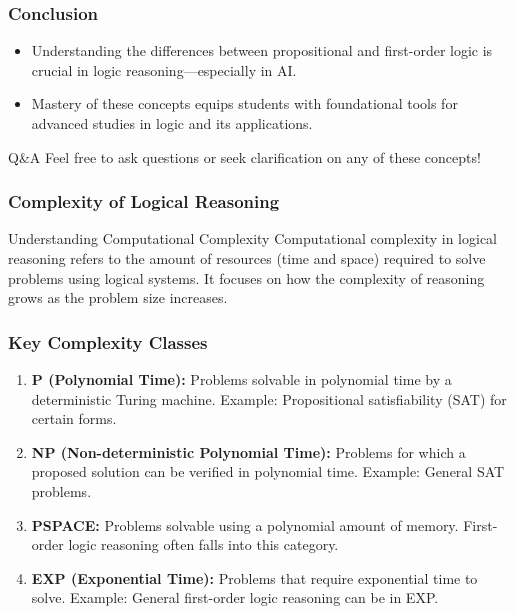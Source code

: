 \documentclass[aspectratio=169]{beamer}
\begin{document}
\begin{frame}[fragile]
    \frametitle{Conclusion}
    \begin{itemize}
        \item Understanding the differences between propositional and first-order logic is crucial in logic reasoning—especially in AI.
        \item Mastery of these concepts equips students with foundational tools for advanced studies in logic and its applications.
    \end{itemize}
    \begin{block}{Q\&A}
        Feel free to ask questions or seek clarification on any of these concepts!
    \end{block}
\end{frame}

\begin{frame}[fragile]
    \frametitle{Complexity of Logical Reasoning}
    \begin{block}{Understanding Computational Complexity}
        Computational complexity in logical reasoning refers to the amount of resources (time and space) required to solve problems using logical systems. It focuses on how the complexity of reasoning grows as the problem size increases.
    \end{block}
\end{frame}

\begin{frame}[fragile]
    \frametitle{Key Complexity Classes}
    \begin{enumerate}
        \item \textbf{P (Polynomial Time):} Problems solvable in polynomial time by a deterministic Turing machine. Example: Propositional satisfiability (SAT) for certain forms.
        \item \textbf{NP (Non-deterministic Polynomial Time):} Problems for which a proposed solution can be verified in polynomial time. Example: General SAT problems.
        \item \textbf{PSPACE:} Problems solvable using a polynomial amount of memory. First-order logic reasoning often falls into this category.
        \item \textbf{EXP (Exponential Time):} Problems that require exponential time to solve. Example: General first-order logic reasoning can be in EXP.
    \end{enumerate}
\end{frame}
\end{document}
